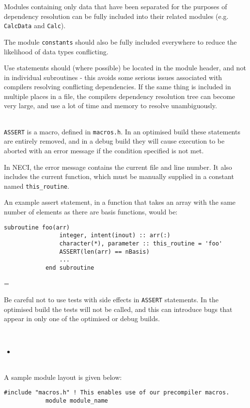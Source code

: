 \documentclass[a4paper,notitlepage]{scrreprt}
\newcommand\headitem[1]{\needspace{1.5\baselineskip}\item[{\boldmath #1 \nopagebreak}] \hfill \\ \nopagebreak}
\let\code\lstinline
\newenvironment{warningbox}
	{\par\begin{mdframed}[%
		linewidth = 2pt, %
	    linecolor = red, %
	    roundcorner = 6pt, %
		backgroundcolor = gray!20
	]\begin{list}{}{\leftmargin=1cm
			           \labelwidth=\leftmargin}\item[\Large\ding{43}]}
	{\end{list}\end{mdframed}\par}
\begin{document}
\begin{description}
		Modules containing only data that have been separated for the purposes
		of dependency resolution can be fully included into their related
		modules (e.g. \code{CalcData} and \code{Calc}).
		
		The module \code{constants} should also be fully included
		everywhere to reduce the likelihood of data types conflicting.

		Use statements should
		(where possible) be located in the module header, and not in
		individual subroutines - this avoids some serious issues associated
		with compilers resolving conflicting dependencies. If the same thing
		is included in multiple places in a file, the compilers dependency
		resolution tree can become very large, and use a lot of time and
		memory to resolve unambiguously.

	
	\headitem{{\ttfamily ASSERT} statements}
		\code{ASSERT} is a macro, defined in \code{macros.h}. In
		an optimised build these statements are entirely removed, and in a
		debug build they will cause execution to be aborted with an error
		message if the condition specified is not met.

		In NECI, the error message contains the current file and line number.
		It also includes the current function, which must be manually supplied
		in a constant named \code{this_routine}.

		An example assert statement, in a function that takes an array with
		the same number of elements as there are basis functions, would be:
		\begin{lstlisting}[gobble=8]
			subroutine foo(arr)
				integer, intent(inout) :: arr(:)
				character(*), parameter :: this_routine = 'foo'
				ASSERT(len(arr) == nBasis)
				...
			end subroutine
		\end{lstlisting}

		\begin{warningbox}
			Be careful not to use tests with side effects in \code{ASSERT}
			statements. In the optimised build the tests will not be called, 
			and this can introduce bugs that appear in only one of the
			optimised or debug builds.
		\end{warningbox}

	\headitem{Modules and interfaces}
		\begin{itemize}
			\item 
		\end{itemize}

	\headitem{Example module layout}
		A sample module layout is given below:
		\begin{lstlisting}[gobble=12]
            #include "macros.h" ! This enables use of our precompiler macros.
            module module_name
            	

\end{lstlisting}
\end{description}
\end{document}
